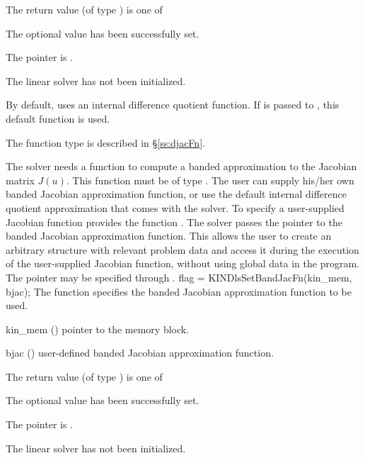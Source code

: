 {
  The return value  (of type ) is one of
  \begin{args}
  \item[\Id{KINDLS\_SUCCESS}] 
    The optional value has been successfully set.
  \item[\Id{KINDLS\_MEM\_NULL}]
    The  pointer is .
  \item[\Id{KINDLS\_LMEM\_NULL}]
    The {\kindense} linear solver has not been initialized.
  \end{args}
}
{
  By default, {\kindense} uses an internal difference quotient function.
  If  is passed to , this default function is used.

  The function type  is described in \S\ref{ss:djacFn}.
}
The 
{\kinband} solver needs a function to compute a banded approximation to
the Jacobian matrix $J(u)$.  This function must be of type . 
The user can supply his/her own banded Jacobian approximation function, 
or use the default internal difference quotient approximation
that comes with the {\kinband} solver.
To specify a user-supplied Jacobian function  {\kinband} provides 
the function .
The {\kinband} solver passes the pointer 
to the banded Jacobian approximation function. This allows the user to
create an arbitrary structure with relevant problem data and access it
during the execution of the user-supplied Jacobian function, without
using global data in the program.  The pointer  may be
specified through .
{
  flag = KINDlsSetBandJacFn(kin\_mem, bjac);
}
{
  The function  specifies the banded Jacobian
  approximation function to be used.
}
{
  \begin{args}
  \item[kin\_mem] ()
    pointer to the {\kinsol} memory block.
  \item[bjac] ()
    user-defined banded Jacobian approximation function.
  \end{args}
}
{
  The return value  (of type ) is one of
  \begin{args}
  \item[\Id{KINDLS\_SUCCESS}] 
    The optional value has been successfully set.
  \item[\Id{KINDLS\_MEM\_NULL}]
    The  pointer is .
  \item[\Id{KINDLS\_LMEM\_NULL}]
    The {\kinband} linear solver has not been initialized.
  \end{args}
}
